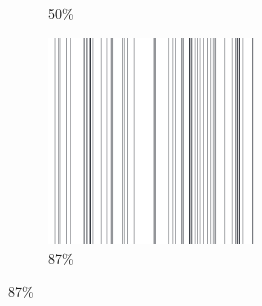 \documentclass[12pt, fleqn]{report}                             %
\theoremstyle{break}                                            %
\begin{document}
\begin{figure}[ht!]
\begin{subfigure}[b]{0.4\linewidth}
          \caption{50\%}
        \end{subfigure}
        \begin{subfigure}[b]{0.4\linewidth}
          \includegraphics[width=0.6\textwidth]{Images/200/d.png}
          \caption{87\%}
        \end{subfigure}
      \end{figure}
\end{document}
